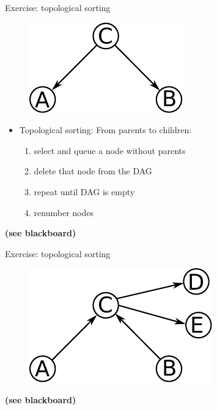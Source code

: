 \begin{frame}{Exercise: topological sorting}


\begin{figure}[h]
	\centering
	\includegraphics[width=0.3\linewidth]{img/cond}%
    \label{fig:cond}%
\end{figure}

	\begin{itemize}
		\item Topological sorting: From parents to children:
			\begin{enumerate}
				\item select and queue a node without parents
				\item delete that node from the DAG
				\item repeat until DAG is empty
				\item renumber nodes
			\end{enumerate}
	\end{itemize}


\textbf{(see blackboard)}


\end{frame}


\begin{frame}{Exercise: topological sorting}


\begin{figure}[h]
	\centering
	\includegraphics[width=0.3\linewidth]{img/dag1}%
    \label{fig:cond}%
\end{figure}

\textbf{(see blackboard)}


\end{frame}

